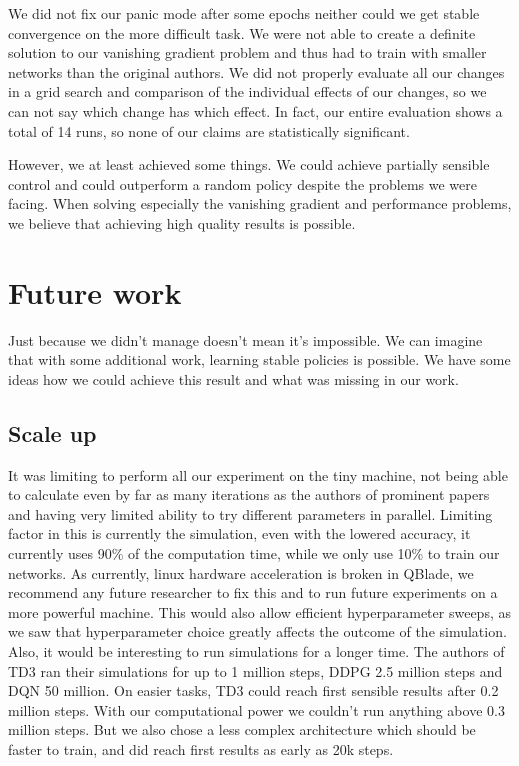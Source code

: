 \documentclass[hyperref,final,beleg]{cgvpub}
\begin{document}
We did not fix our panic mode after some epochs neither could we get stable convergence on the more difficult task. We were not able to create a definite solution to our vanishing gradient problem and thus had to train with smaller networks than the original authors. We did not properly evaluate all our changes in a grid search and comparison of the individual effects of our changes, so we can not say which change has which effect. In fact, our entire evaluation shows a total of 14 runs, so none of our claims are statistically significant.

However, we at least achieved some things. We could achieve partially sensible control and could outperform a random policy despite the problems we were facing. When solving especially the vanishing gradient and performance problems, we believe that achieving high quality results is possible. 

\chapter{Future work}

Just because we didn't manage doesn't mean it's impossible. We can imagine that with some additional work, learning stable policies is possible. We have some ideas how we could achieve this result and what was missing in our work.

\section{Scale up}

It was limiting to perform all our experiment on the tiny machine, not being able to calculate even by far as many iterations as the authors of prominent papers and having very limited ability to try different parameters in parallel. Limiting factor in this is currently the simulation, even with the lowered accuracy, it currently uses 90\% of the computation time, while we only use 10\% to train our networks. As currently, linux hardware acceleration is broken in QBlade, we recommend any future researcher to fix this and to run future experiments on a more powerful machine. This would also allow efficient hyperparameter sweeps, as we saw that hyperparameter choice greatly affects the outcome of the simulation. Also, it would be interesting to run simulations for a longer time. The authors of \ac{TD3} ran their simulations for up to 1 million steps, \ac{DDPG} 2.5 million steps and \ac{DQN} 50 million. On easier tasks, TD3 could reach first sensible results after 0.2 million steps. With our computational power we couldn't run anything above 0.3 million steps. But we also chose a less complex architecture which should be faster to train, and did reach first results as early as 20k steps.
\end{document}
